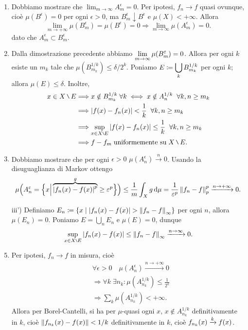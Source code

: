 \begin{enumerate}

	\item Dobbiamo mostrare che $\lim_{m \to \infty} A_m^\epsilon = 0$.
	Per ipotesi, $f_n \to f$ quasi ovunque, cioè $\mu(B^\epsilon) = 0$ per ogni $\epsilon > 0$, ma $B_m^\epsilon \downarrow B^\epsilon$ e $\mu(X) < +\infty$.
	Allora
	$$
		\lim_{m \to +\infty} \mu(B_m^\epsilon) = \mu(B^\epsilon) = 0 \Longrightarrow \lim_{m \to \infty} \mu(A_m^\epsilon) = 0.
	$$
	dato che $A_m^\epsilon \subset B_m^\epsilon$.


	\item Dalla dimostrazione precedente abbiamo $\displaystyle \lim_{m \to \infty} \mu(B_m^\varepsilon) = 0$. 
	Allora per ogni $k$ esiste un $m_k$ tale che $\mu \left( B_{m_k}^{1/k} \right) \leq \delta / 2^k$.
	Poniamo $\displaystyle E \coloneqq  \bigcup_{k} B_{m_k}^{1/k}$ per ogni $k$; allora $\mu(E) \leq \delta$.
	Inoltre,
	\begin{align*}
		x \in X \setminus E & \Longrightarrow x \notin B_{m_k}^{1/k} \; \forall k \iff x \notin A_n^{1/k} \mquad \forall k,n \geq m_ k \\
		& \Longrightarrow \left| f(x) - f_n(x) \right| < \frac{1}{k} \mquad \forall k,n \geq m_k \\
		& \Longrightarrow \sup_{x \in X \setminus E} \left| f(x) - f_n(x) \right| \leq \frac{1}{k} \mquad \forall k,n \geq m_k \\
		& \Longrightarrow f - f_m \; \text{uniformemente su} \; X \setminus E.
	\end{align*}


	\item Dobbiamo mostrare che per ogni $\epsilon > 0$ $\mu(A_n^\epsilon) \xrightarrow{n} 0$.
	Usando la disuguaglianza di Markov ottengo
	$$
		\mu \Big( A_n^\varepsilon= \Big\{ x \Big| \overbrace{\left| f_n(x) - f(x) \right|^p}^{g} \geq \varepsilon^p \Big\} \Big)
		\leq \frac{1}{m} \int_{X}^{} g \,\mathrm{d} \mu = \frac{1}{\varepsilon^p} \left\lVert f_n - f \right\rVert_p^p \xrightarrow{n \to +\infty} 0.
	$$


	\item[iii')] Definiamo $\displaystyle E_n \coloneqq  \left\{ x \;\middle|\; \left| f_n(x) - f(x) \right| > \left\lVert f_n - f \right\rVert_\infty \right\}$ per ogni $n$, allora $\mu(E_n) = 0$.
	Poniamo $E = \bigcup_{n} E_n$ e $\mu(E) = 0$, dunque
	$$
		\sup_{x \in X\setminus E} \left| f_n(x) - f(x) \right| \leq \norm{f_n - f}_\infty \xrightarrow{n \to \infty} 0.
	$$


	\item Per ipotesi, $f_n \to f$ in misura, cioè
	\begin{align*}
		& \forall \epsilon > 0 \quad \mu \left( A_n^\epsilon \right) \xrightarrow{n \to +\infty} 0 \\
		& \Longrightarrow \forall k \; \exists n_k \colon \mu \left( A_{n_k}^{1/k} \right) \leq \frac{1}{2^k} \\
		& \Longrightarrow \sum_{k}^{} \mu \left( A_{n_k}^{1/k} \right) < +\infty. 
	\end{align*}
	Allora per Borel-Cantelli, si ha per $\mu$-quasi ogni $x$, $x \notin A_{n_k}^{1/k}$ definitivamente in $k$, cioè $\left\lVert f_{n_k}(x) - f(x) \right\rVert < 1/k$ definitivamente in $k$, cioè $\displaystyle f_{n_k}(x) \xrightarrow{k} f(x)$.



\end{enumerate}
